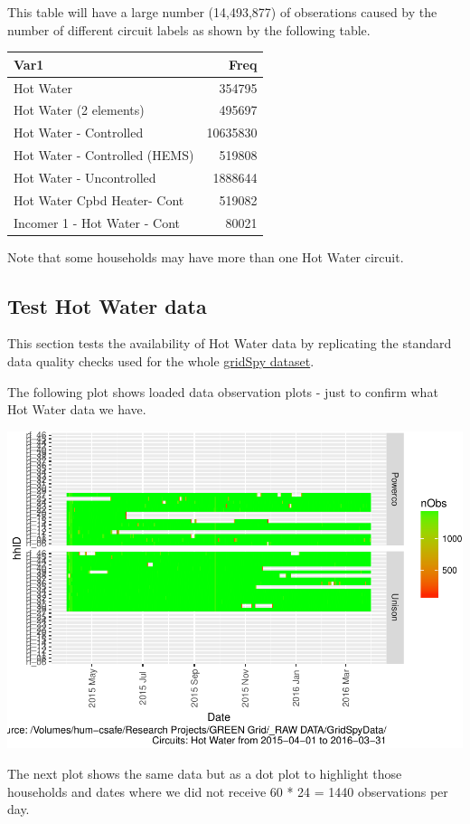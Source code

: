 \documentclass[]{article}
\begin{document}
This table will have a large number (14,493,877) of obserations caused
by the number of different circuit labels as shown by the following
table.

\begin{longtable}[]{@{}lr@{}}
\toprule
Var1 & Freq\tabularnewline
\midrule
\endhead
Hot Water & 354795\tabularnewline
Hot Water (2 elements) & 495697\tabularnewline
Hot Water - Controlled & 10635830\tabularnewline
Hot Water - Controlled (HEMS) & 519808\tabularnewline
Hot Water - Uncontrolled & 1888644\tabularnewline
Hot Water Cpbd Heater- Cont & 519082\tabularnewline
Incomer 1 - Hot Water - Cont & 80021\tabularnewline
\bottomrule
\end{longtable}

Note that some households may have more than one Hot Water circuit.

\subsection{Test Hot Water data}\label{test-hot-water-data}

This section tests the availability of Hot Water data by replicating the
standard data quality checks used for the whole
\href{https://git.soton.ac.uk/ba1e12/nzGREENGrid/tree/master/dataProcessing/gridSpy}{gridSpy
dataset}.

The following plot shows loaded data observation plots - just to confirm
what Hot Water data we have.

\includegraphics{nzGGHouseholdPowerDemandProfile_Hot Water_2015-04-01_2016-03-31_files/figure-latex/loadedFilesObs Tile Plot-1.pdf}

The next plot shows the same data but as a dot plot to highlight those
households and dates where we did not receive 60 * 24 = 1440
observations per day.
\end{document}
